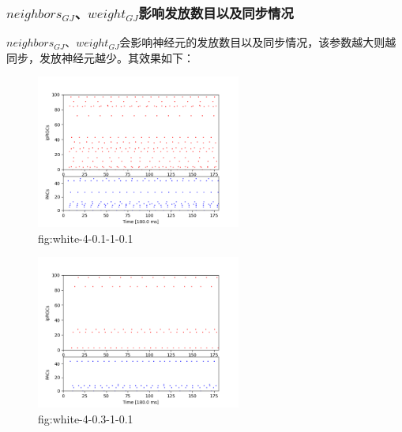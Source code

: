 \documentclass[lang=cn,11pt,a4paper,cite=numbers]{elegantpaper}
\begin{document}
\subsubsection{$neighbors_{GJ}$、$weight_{GJ}$影响发放数目以及同步情况}
   $neighbors_{GJ}$、$weight_{GJ}$会影响神经元的发放数目以及同步情况，该参数越大则越同步，发放神经元越少。其效果如下：
\begin{figure}[!htb]
  \centering
  \includegraphics[width=0.6\textwidth]{figs/white-4-0.1-1-0.1.png}
  \caption{fig:white-4-0.1-1-0.1}
  \label{fig:white-4-0.1-1-0.1}
\end{figure}
\begin{figure}[!htb]
  \centering
  \includegraphics[width=0.6\textwidth]{figs/white-4-0.3-1-0.1.png}
  \caption{fig:white-4-0.3-1-0.1}
  \label{fig:white-4-0.3-1-0.1}
\end{figure}


\end{document}
